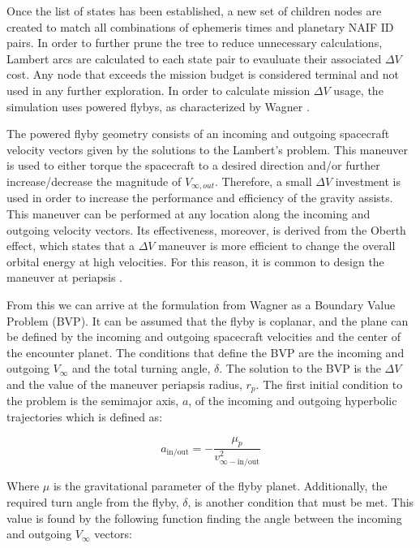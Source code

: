 \documentclass[letterpaper, preprint, paper,11pt]{AAS}	%
\begin{document}
Once the list of states has been established, a new set of children nodes are created to match all combinations of ephemeris times and planetary NAIF ID pairs. In order to further prune the tree to reduce unnecessary calculations, Lambert arcs are calculated to each state pair to evauluate their associated $\Delta V$ cost. Any node that exceeds the mission budget is considered terminal and not used in any further exploration. In order to calculate mission $\Delta V$ usage, the simulation uses powered flybys, as characterized by Wagner \cite{Wagner2015}.

The powered flyby geometry consists of an incoming and outgoing spacecraft velocity vectors given by the solutions to the Lambert’s problem. This maneuver is used to either torque the spacecraft to a desired direction and/or further increase/decrease the magnitude of $V_{\infty, out}$. Therefore, a small $\Delta V$ investment is used in order to increase the performance and efficiency of the gravity assists. This maneuver can be performed at any location along the incoming and outgoing velocity vectors. Its effectiveness, moreover, is derived from the Oberth effect, which states that a $\Delta V$ maneuver is more efficient to change the overall orbital energy at high velocities. For this reason, it is common to design the maneuver at periapsis \cite{Brennan2015}. 

From this we can arrive at the formulation from Wagner as a Boundary Value Problem (BVP)\cite{Wagner2015}. It can be assumed that the flyby is coplanar, and the plane can be defined by the incoming and outgoing spacecraft velocities and the center of the encounter planet. The conditions that define the BVP are the incoming and outgoing $V_\infty$ and the total turning angle, $\delta$. The solution to the BVP is the $\Delta V$ and the value of the maneuver periapsis radius, $r_p$. The first initial condition to the problem is the semimajor axis, $a$, of the incoming and outgoing hyperbolic trajectories which is defined as:

\begin{equation}
    a_\text{in/out} = -\frac{\mu_p}{v^2_{\infty-\text{in/out}}}
\end{equation}

Where $\mu$ is the gravitational parameter of the flyby planet. Additionally, the required turn angle from the flyby, $\delta$, is another condition that must be met. This value is found by the following function finding the angle between the incoming and outgoing $V_\infty$ vectors:
\end{document}
